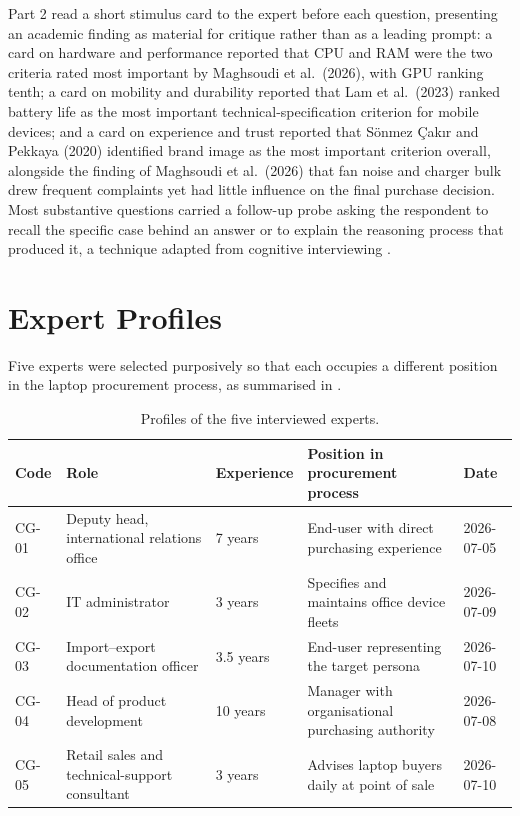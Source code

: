 Part 2 read a short stimulus card to the expert before each question, presenting an
academic finding as material for critique rather than as a leading prompt: a card on
hardware and performance reported that CPU and RAM were the two criteria rated most
important by Maghsoudi et al.\ (2026), with GPU ranking tenth; a card on mobility and
durability reported that Lam et al.\ (2023) ranked battery life as the most important
technical-specification criterion for mobile devices; and a card on experience and trust
reported that Sönmez Çakır and Pekkaya (2020) identified brand image as the most important
criterion overall, alongside the finding of Maghsoudi et al.\ (2026) that fan noise and
charger bulk drew frequent complaints yet had little influence on the final purchase
decision. Most substantive questions carried a follow-up probe asking the respondent to
recall the specific case behind an answer or to explain the reasoning process that produced
it, a technique adapted from cognitive interviewing \parencite{willis_cognitive_2005}.

\section{Expert Profiles}\label{app:interview-profiles}

Five experts were selected purposively so that each occupies a different position in the
laptop procurement process, as summarised in .

\begin{table}[htbp]
  \centering
  \caption{Profiles of the five interviewed experts.}
  \label{tab:expert-profiles}
  \footnotesize
  \begin{tabularx}{\textwidth}{@{}L{1.25cm}L{3.5cm}L{1.8cm}YL{2.25cm}@{}}
    \toprule
    \textbf{Code} & \textbf{Role} & \textbf{Experience} & \textbf{Position in procurement process} & \textbf{Date} \\
    \midrule
    CG-01 & Deputy head, international relations office & 7 years & End-user with direct purchasing experience & 2026-07-05 \\
    CG-02 & IT administrator & 3 years & Specifies and maintains office device fleets & 2026-07-09 \\
    CG-03 & Import--export documentation officer & 3.5 years & End-user representing the target persona & 2026-07-10 \\
    CG-04 & Head of product development & 10 years & Manager with organisational purchasing authority & 2026-07-08 \\
    CG-05 & Retail sales and technical-support consultant & 3 years & Advises laptop buyers daily at point of sale & 2026-07-10 \\
    \bottomrule
  \end{tabularx}
\end{table}

